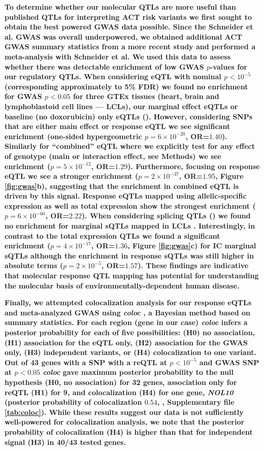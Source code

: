 \documentclass[9pt,lineno]{elife}
\newcommand{\tempbold}[1]{\textbf{#1}}
\begin{document}
\tempbold{To determine whether our molecular QTLs are more useful than published QTLs for interpreting ACT risk variants we first sought to obtain the best powered GWAS data possible. Since the Schneider et al. GWAS was overall underpowered, we obtained additional ACT GWAS summary statistics from a more recent study \citep{Serie2017} and performed a meta-analysis with Schneider et al. We used this data to assess whether there was detectable enrichment of low GWAS $p$-values for our regulatory QTLs. When considering eQTL with nominal $p < 10^{-5}$ (corresponding approximately to 5\% FDR) we found no enrichment for GWAS $p<0.05$ for three GTEx tissues (heart, brain and lymphoblastoid cell lines --- LCLs), our marginal effect eQTLs or baseline (no doxorubicin) only eQTLs (\FIGSUPP[gwas]{meta_enrichment}). However, considering SNPs that are either main effect or response eQTL we see significant enrichment (one-sided hypergeometric $p=6 \times 10^{-20}$, OR=$1.40$). Similarly for ``combined'' eQTL where we explicitly test for any effect of genotype  (main or interaction effect, see Methods) we see enrichment ($p=5 \times 10^{-12}$, OR=$1.29$). Furthermore, focusing on response eQTL we see a stronger enrichment ($p=2 \times 10^{-37}$, OR=$1.95$, Figure \ref{fig:gwas}b), suggesting that the enrichment in combined eQTL is driven by this signal. Response eQTLs mapped using allelic-specific expression as well as total expression show the strongest enrichment ($p=6 \times 10^{-60}$, OR=$2.22$). When considering splicing QTLs (\FIGSUPP[gwas]{sQTL_meta_enrichment}) we found no enrichment for marginal sQTLs mapped in LCLs \citep{li2016rna}. Interestingly, in contrast to the total expression QTLs we found a significant enrichment ($p=4 \times 10^{-17}$, OR=$1.36$, Figure \ref{fig:gwas}c) for IC marginal sQTLs although the enrichment in response sQTLs was still higher in absolute terms ($p=2 \times 10^{-5}$, OR=$1.57$). These findings are indicative that molecular response QTL mapping has potential for understanding the molecular basis of environmentally-dependent human disease.}

\tempbold{Finally, we attempted colocalization analysis for our response eQTLs and meta-analyzed GWAS using \emph{coloc} \citep{Giambartolomei2014-ux}, a Bayesian method based on summary statistics. For each region (gene in our case) \emph{coloc} infers a posterior probability for each of five possibilities: (H0) no association, (H1) association for the eQTL only, (H2) association for the GWAS only, (H3) independent variants, or (H4) colocalization to one variant. Out of 43 genes with a SNP with a reQTL at $p<10^{-5}$ and GWAS SNP at $p<0.05$ \emph{coloc} gave maximum posterior probability to the null hypothesis (H0, no association) for 32 genes, association only for reQTL (H1) for 9, and colocalization (H4) for one gene, \emph{NOL10} (posterior probability of colocalization $0.54$, \FIGSUPP[gwas]{coloc}, Supplementary file \ref{tab:coloc}). While these results suggest our data is not sufficiently well-powered for colocalization analysis, we note that the posterior probability of colocalization (H4) is higher than that for independent signal (H3) in 40/43 tested genes.}
\end{document}
